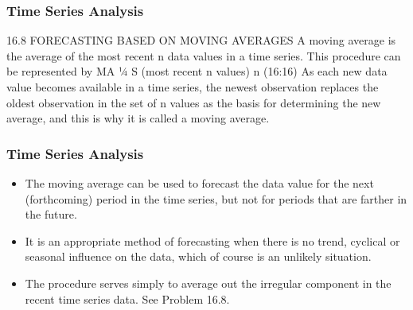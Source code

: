 \begin{frame}
\frametitle{Time Series Analysis}
16.8 FORECASTING BASED ON MOVING AVERAGES
A moving average is the average of the most recent n data values in a time series. This procedure can be
represented by
MA ¼
S (most recent n values)
n
(16:16)
As each new data value becomes available in a time series, the newest observation replaces the oldest
observation in the set of n values as the basis for determining the new average, and this is why it is called a
moving average.
\end{frame}
\begin{frame}
\frametitle{Time Series Analysis}
\begin{itemize}
\item The moving average can be used to forecast the data value for the next (forthcoming) period in the time
series, but not for periods that are farther in the future. 
\item It is an appropriate method of forecasting when there is
no trend, cyclical or seasonal influence on the data, which of course is an unlikely situation. 
\item The procedure
serves simply to average out the irregular component in the recent time series data. See Problem 16.8.
\end{itemize}
\end{frame}
